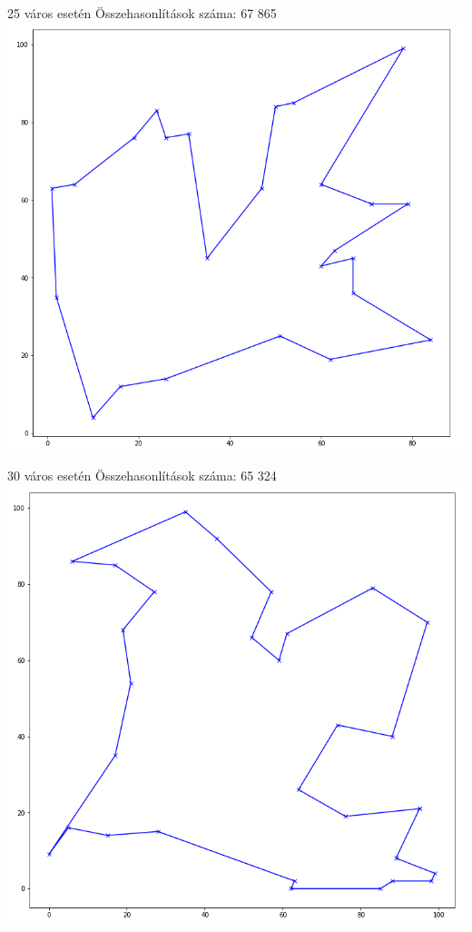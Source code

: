 \documentclass[12pt,a4paper]{article}
\begin{document}
25 város esetén
Összehasonlítások száma: 67 865
\includegraphics[scale=0.4]{25.png}

30 város esetén
Összehasonlítások száma: 65 324
\includegraphics[scale=0.4]{30.png}
\end{document}
